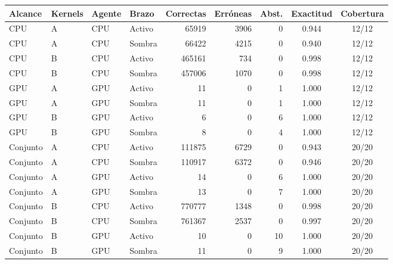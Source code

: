 \begin{tabular}{@{}llllrrrcc@{}}
\toprule
\textbf{Alcance} & \textbf{Kernels} & \textbf{Agente} & \textbf{Brazo} & \textbf{Correctas} & \textbf{Erróneas} & \textbf{Abst.} & \textbf{Exactitud} & \textbf{Cobertura} \\
\midrule
CPU & A & CPU & Activo & 65919 & 3906 & 0 & 0.944 & 12/12 \\
CPU & A & CPU & Sombra & 66422 & 4215 & 0 & 0.940 & 12/12 \\
CPU & B & CPU & Activo & 465161 & 734 & 0 & 0.998 & 12/12 \\
CPU & B & CPU & Sombra & 457006 & 1070 & 0 & 0.998 & 12/12 \\
GPU & A & GPU & Activo & 11 & 0 & 1 & 1.000 & 12/12 \\
GPU & A & GPU & Sombra & 11 & 0 & 1 & 1.000 & 12/12 \\
GPU & B & GPU & Activo & 6 & 0 & 6 & 1.000 & 12/12 \\
GPU & B & GPU & Sombra & 8 & 0 & 4 & 1.000 & 12/12 \\
Conjunto & A & CPU & Activo & 111875 & 6729 & 0 & 0.943 & 20/20 \\
Conjunto & A & CPU & Sombra & 110917 & 6372 & 0 & 0.946 & 20/20 \\
Conjunto & A & GPU & Activo & 14 & 0 & 6 & 1.000 & 20/20 \\
Conjunto & A & GPU & Sombra & 13 & 0 & 7 & 1.000 & 20/20 \\
Conjunto & B & CPU & Activo & 770777 & 1348 & 0 & 0.998 & 20/20 \\
Conjunto & B & CPU & Sombra & 761367 & 2537 & 0 & 0.997 & 20/20 \\
Conjunto & B & GPU & Activo & 10 & 0 & 10 & 1.000 & 20/20 \\
Conjunto & B & GPU & Sombra & 11 & 0 & 9 & 1.000 & 20/20 \\
\bottomrule
\end{tabular}
